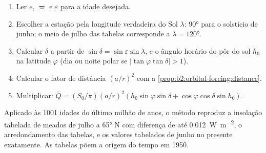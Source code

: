 \begin{method}\label{met:b2:orbital-forcing:curve}
\begin{enumerate}
  \item Ler $e$, $\varpi$ e $\varepsilon$ para a idade desejada.
  \item Escolher a estação pela longitude verdadeira do Sol $\lambda$: \ang{90} para o solstício de junho;
        o meio de julho das tabelas corresponde a $\lambda = \ang{120}$.
  \item Calcular $\delta$ a partir de $\sin\delta = \sin\varepsilon\sin\lambda$, e o ângulo horário do
        pôr do sol $h_0$ na latitude $\varphi$ (dia ou noite polar se $|\tan\varphi\tan\delta| > 1$).
  \item Calcular o fator de distância $(a/r)^2$ com a \cref{prop:b2:orbital-forcing:distance}.
  \item Multiplicar: $\bar Q = (S_0/\pi)(a/r)^2(h_0\sin\varphi\sin\delta +
        \cos\varphi\cos\delta\sin h_0)$.
\end{enumerate}
\end{method}

Aplicado às 1001 idades do último milhão de anos, o método reproduz a insolação tabelada de meados de julho
a \ang{65} N com diferença de até \qty{0.012}{W.m^{-2}}, o arredondamento das tabelas, e os
valores tabelados de junho no presente exatamente. As tabelas põem a origem do tempo em 1950.

